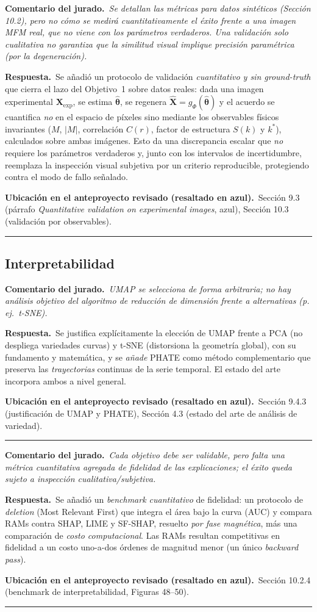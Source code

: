 \documentclass[11pt]{article}
\newcommand{\comentario}[1]{\par\smallskip\noindent\textbf{\color{jgris}Comentario del jurado.}\ \textit{#1}\par}
\newcommand{\respuesta}[1]{\par\smallskip\noindent\textbf{\color{jverde}Respuesta.}\ #1\par}
\newcommand{\ubic}[1]{\par\smallskip\noindent\textbf{\color{jazul}Ubicación en el anteproyecto revisado (resaltado en azul).}\ #1\par\medskip\hrule\medskip}
\begin{document}
\comentario{Se detallan las métricas para datos sintéticos (Sección 10.2), pero no cómo se medirá cuantitativamente el éxito frente a una imagen MFM real, que no viene con los parámetros verdaderos. Una validación solo cualitativa no garantiza que la similitud visual implique precisión paramétrica (por la degeneración).}
\respuesta{Se añadió un protocolo de validación \emph{cuantitativo y sin ground-truth} que cierra el lazo del Objetivo~1 sobre datos reales: dada una imagen experimental $\mathbf{X}_{\mathrm{exp}}$, se estima $\hat{\boldsymbol{\theta}}$, se regenera $\hat{\mathbf{X}}=g_\Phi(\hat{\boldsymbol{\theta}})$ y el acuerdo se cuantifica \emph{no} en el espacio de píxeles sino mediante los observables físicos invariantes ($M$, $|M|$, correlación $C(r)$, factor de estructura $S(k)$ y $k^{\ast}$), calculados sobre ambas imágenes. Esto da una discrepancia escalar que \emph{no} requiere los parámetros verdaderos y, junto con los intervalos de incertidumbre, reemplaza la inspección visual subjetiva por un criterio reproducible, protegiendo contra el modo de fallo señalado.}
\ubic{Sección 9.3 (párrafo \emph{Quantitative validation on experimental images}, azul), Sección 10.3 (validación por observables).}

\subsection{Interpretabilidad}

\comentario{UMAP se selecciona de forma arbitraria; no hay análisis objetivo del algoritmo de reducción de dimensión frente a alternativas (p.\,ej.\ t-SNE).}
\respuesta{Se justifica explícitamente la elección de UMAP frente a PCA (no despliega variedades curvas) y t-SNE (distorsiona la geometría global), con su fundamento y matemática, y se \emph{añade} PHATE como método complementario que preserva las \emph{trayectorias} continuas de la serie temporal. El estado del arte incorpora ambos a nivel general.}
\ubic{Sección 9.4.3 (justificación de UMAP y PHATE), Sección 4.3 (estado del arte de análisis de variedad).}

\comentario{Cada objetivo debe ser validable, pero falta una métrica cuantitativa agregada de fidelidad de las explicaciones; el éxito queda sujeto a inspección cualitativa/subjetiva.}
\respuesta{Se añadió un \emph{benchmark cuantitativo} de fidelidad: un protocolo de \emph{deletion} (Most Relevant First) que integra el área bajo la curva (AUC) y compara RAMs contra SHAP, LIME y SF-SHAP, resuelto \emph{por fase magnética}, más una comparación de \emph{costo computacional}. Las RAMs resultan competitivas en fidelidad a un costo uno-a-dos órdenes de magnitud menor (un único \emph{backward pass}).}
\ubic{Sección 10.2.4 (benchmark de interpretabilidad, Figuras 48--50).}
\end{document}
